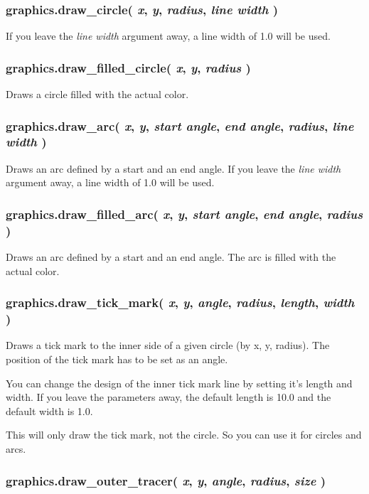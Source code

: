\documentclass[11pt,parskip=half,a4paper]{scrartcl}
\begin{document}
\subsubsection{graphics.draw\_circle( \emph{x}, \emph{y}, \emph{radius}, \emph{line width} )}

If you leave the \emph{line width} argument away, a line width of 1.0 will be used.

\subsubsection{graphics.draw\_filled\_circle( \emph{x}, \emph{y}, \emph{radius} )}

Draws a circle filled with the actual color.

\subsubsection{graphics.draw\_arc( \emph{x}, \emph{y}, \emph{start angle}, \emph{end angle}, \emph{radius}, \emph{line width} )}

Draws an arc defined by a start and an end angle. If you leave the \emph{line width} argument away, a line width of 1.0 will be used.

\subsubsection{graphics.draw\_filled\_arc( \emph{x}, \emph{y}, \emph{start angle}, \emph{end angle}, \emph{radius} )}

Draws an arc defined by a start and an end angle. The arc is filled with the actual color.

\subsubsection{graphics.draw\_tick\_mark( \emph{x}, \emph{y}, \emph{angle}, \emph{radius}, \emph{length}, \emph{width} )}

Draws a tick mark to the inner side of a given circle (by x, y, radius). The position of the tick mark has to be set as an angle.

You can change the design of the inner tick mark line by setting it's length and width. If you leave the parameters away, the default length is 10.0 and the default width is 1.0.

This will only draw the tick mark, not the circle. So you can use it for circles and arcs.

\subsubsection{graphics.draw\_outer\_tracer( \emph{x}, \emph{y}, \emph{angle}, \emph{radius}, \emph{size} )}
\end{document}
